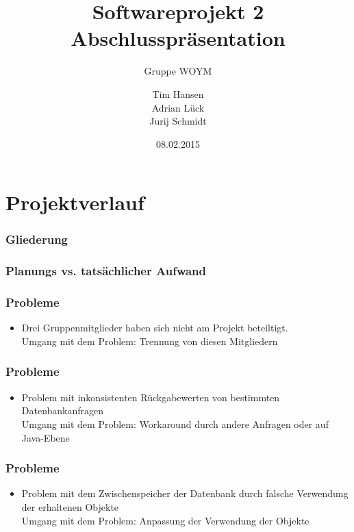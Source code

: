 \documentclass{beamer}
\title{Softwareprojekt 2 Abschlusspräsentation}
\subtitle{Gruppe WOYM}
\date{08.02.2015}
\author{Tim Hansen\\ Adrian Lück\\ Jurij Schmidt}
\institute{Universität Bremen}
\begin{document}
\maketitle

\section{Projektverlauf}
\begin{frame}
\frametitle{Gliederung}
\tableofcontents[currentsection]
\end{frame}

\begin{frame}
\frametitle{Planungs vs. tatsächlicher Aufwand}

\end{frame}

\begin{frame}
\frametitle{Probleme}
\begin{itemize}
\item Drei Gruppenmitglieder haben sich nicht am Projekt beteiltigt.\\ \vspace{10pt}
	{ Umgang mit dem Problem:} Trennung von diesen Mitgliedern
\end{itemize}
\end{frame}

\begin{frame}
\frametitle{Probleme}
\begin{itemize}	
\item Problem mit inkonsistenten Rückgabewerten von bestimmten Datenbankanfragen\\ \vspace{10pt}
	{ Umgang mit dem Problem:} Workaround durch andere Anfragen oder auf Java-Ebene
\end{itemize}
\end{frame}

\begin{frame}
\frametitle{Probleme}
\begin{itemize}	
\item Problem mit dem Zwischenspeicher der Datenbank durch falsche Verwendung der erhaltenen Objekte\\ \vspace{10pt}
{ Umgang mit dem Problem:} Anpassung der Verwendung der Objekte
\end{itemize}
\end{frame}
\end{document}
